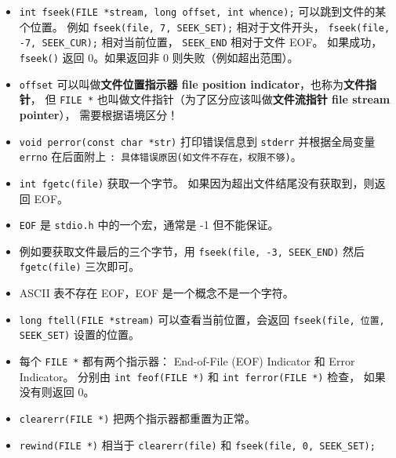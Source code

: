 \begin{itemize}
\begin{lstlisting}[language=cpp]
    // Step 2: Jump to the beginning of the file using fseek()
    fseek(file, 0, SEEK_SET);

    // Step 3: Read from the file and print its
    // contents to the console
    char buffer[100];
    printf("Reading the file contents:\n");
    while (fgets(buffer, sizeof(buffer), file) != NULL) {
        printf("%s", buffer);
    }

    // Step 4: Move the file pointer to a specific location, modify contents
    fseek(file, 7, SEEK_SET); // Jump to the 8th character
    fputs("Universe", file);  // Overwrite "World" with "Universe"

    // Step 5: Jump to the beginning again to read the updated content
    fseek(file, 0, SEEK_SET);
    printf("\nUpdated file contents:\n");
    while (fgets(buffer, sizeof(buffer), file) != NULL) {
        printf("%s", buffer);
    }

    // Close the file
    fclose(file);
    return 0;
}
\end{lstlisting}
\item \verb`int fseek(FILE *stream, long offset, int whence);` 可以跳到文件的某个位置。 例如 \verb`fseek(file, 7, SEEK_SET);` 相对于文件开头， \verb`fseek(file, -7, SEEK_CUR);` 相对当前位置， \verb`SEEK_END` 相对于文件 EOF。 如果成功，\verb`fseek()` 返回 0。如果返回非 0 则失败（例如超出范围）。
\item \verb`offset` 可以叫做\textbf{文件位置指示器 file position indicator}，也称为\textbf{文件指针}， 但 \verb`FILE *` 也叫做文件指针（为了区分应该叫做\textbf{文件流指针 file stream pointer}）， 需要根据语境区分！
\item \verb`void perror(const char *str)` 打印错误信息到 \verb`stderr` 并根据全局变量 \verb`errno` 在后面附上 \verb`: 具体错误原因(如文件不存在，权限不够)`。
\item \verb`int fgetc(file)` 获取一个字节。 如果因为超出文件结尾没有获取到，则返回 EOF。
\item \verb`EOF` 是 \verb`stdio.h` 中的一个宏，通常是 -1 但不能保证。
\item 例如要获取文件最后的三个字节，用 \verb`fseek(file, -3, SEEK_END)` 然后 \verb`fgetc(file)` 三次即可。
\item ASCII 表不存在 EOF，EOF 是一个概念不是一个字符。
\item \verb`long ftell(FILE *stream)` 可以查看当前位置，会返回 \verb`fseek(file, 位置, SEEK_SET)` 设置的位置。
\item 每个 \verb`FILE *` 都有两个指示器： End-of-File (EOF) Indicator 和 Error Indicator。 分别由 \verb`int feof(FILE *)` 和 \verb`int ferror(FILE *)` 检查， 如果没有则返回 0。
\item \verb`clearerr(FILE *)` 把两个指示器都重置为正常。
\item \verb`rewind(FILE *)` 相当于 \verb`clearerr(file)` 和 \verb`fseek(file, 0, SEEK_SET);`
\end{itemize}
